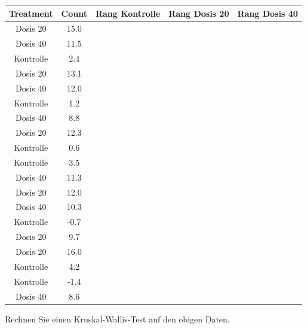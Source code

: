 \documentclass[a4paper, 9pt]{scrartcl}\usepackage[]{graphicx}\usepackage[]{xcolor}
\newenvironment{knitrout}{}{} %
\begin{document}
\begin{knitrout}
\color{fgcolor}\begin{table}[!h]
\centering
\begin{tabular}{ccccc}
\toprule
Treatment & Count & Rang Kontrolle & Rang Dosis 20 & Rang Dosis 40\\
\midrule
Dosis 20 & 15.0 &  &  & \\
Dosis 40 & 11.5 &  &  & \\
Kontrolle & 2.4 &  &  & \\
Dosis 20 & 13.1 &  &  & \\
Dosis 40 & 12.0 &  &  & \\
\addlinespace
Kontrolle & 1.2 &  &  & \\
Dosis 40 & 8.8 &  &  & \\
Dosis 20 & 12.3 &  &  & \\
Kontrolle & 0.6 &  &  & \\
Kontrolle & 3.5 &  &  & \\
\addlinespace
Dosis 40 & 11.3 &  &  & \\
Dosis 20 & 12.0 &  &  & \\
Dosis 40 & 10.3 &  &  & \\
Kontrolle & -0.7 &  &  & \\
Dosis 20 & 9.7 &  &  & \\
\addlinespace
Dosis 20 & 16.0 &  &  & \\
Kontrolle & 4.2 &  &  & \\
Kontrolle & -1.4 &  &  & \\
Dosis 40 & 8.6 &  &  & \\
\bottomrule
\end{tabular}
\end{table}

\end{knitrout}

Rechnen Sie einen Kruskal-Wallis-Test auf den obigen Daten.
\end{document}
